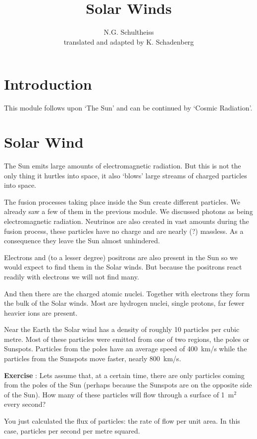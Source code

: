 


\author{N.G. Schultheiss \\ translated and adapted by K. Schadenberg}
\date{}
\title{Solar Winds}



\maketitle

\section{Introduction}
This module follows upon `The Sun' and can be continued by `Cosmic Radiation'.

\section{Solar Wind}
The Sun emits large amounts of electromagnetic radiation. But this is not the only thing it hurtles into space, it also `blows' large streams of charged particles into space.

The fusion processes taking place inside the Sun create different particles. We already saw a few of them in the previous module. We discussed photons as being electromagnetic radiation. Neutrinos are also created in vast amounts during the fusion process, these particles have no charge and are nearly (?) massless. As a consequence they leave the Sun almost unhindered.

Electrons and (to a lesser degree) positrons are also present in the Sun so we would expect to find them in the Solar winds. But because the positrons react readily with electrons we will not find many.

And then there are the charged atomic nuclei. Together with electrons they form the bulk of the Solar winds. Most are hydrogen nuclei, single protons, far fewer heavier ions are present.

Near the Earth the Solar wind has a density of roughly 10 particles per cubic metre. Most of these particles were emitted from one of two regions, the poles or Sunspots. Particles from the poles have an average speed of 400~km/s while the particles from the Sunspots move faster, nearly 800~km/s. 

\begin{shaded}
\textbf{Exercise \theExercise {}} : Lets assume that, at a certain time, there are only particles coming from the poles of the Sun (perhaps because the Sunspots are on the opposite side of the Sun). How many of these particles will flow through a surface of 1~m$^2$ every second?

You just calculated the flux of particles: the rate of flow per unit area. In this case, particles per second per metre squared.\end{shaded}


